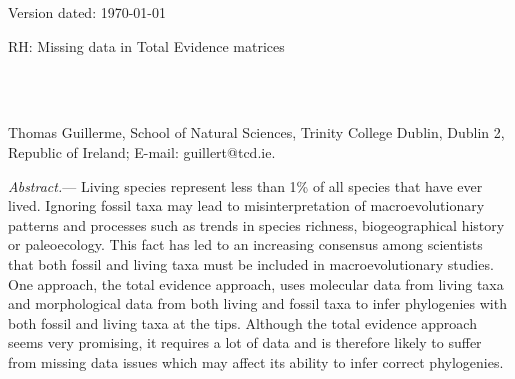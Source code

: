 \documentclass[12pt,letterpaper]{article}
\renewcommand{\subsubsection}[1]{%
\vspace{2ex}
\noindent
\textit{#1.}---}
\begin{document}
\begin{flushright}
Version dated: \today
\end{flushright}
\bigskip
\noindent RH: Missing data in Total Evidence matrices %

\bigskip
\medskip
\begin{center}

\bigskip


\\
\\
\end{center}
\medskip
{} Thomas Guillerme, School of Natural Sciences, Trinity College Dublin, Dublin 2, Republic of Ireland; E-mail: guillert@tcd.ie.\\
\vspace{1in}



%
%


\subsubsection{Abstract}
Living species represent less than 1\% of all species that have ever lived. Ignoring fossil taxa may lead to misinterpretation of macroevolutionary patterns and processes such as trends in species richness, biogeographical history or paleoecology.
This fact has led to an increasing consensus among scientists that both fossil and living taxa must be included in macroevolutionary studies.
One approach, the total evidence approach, uses molecular data from living taxa and morphological data from both living and fossil taxa to infer phylogenies with both fossil and living taxa at the tips.
Although the total evidence approach seems very promising, it requires a lot of data and is therefore likely to suffer from missing data issues which may affect its ability to infer correct phylogenies.
\end{document}
